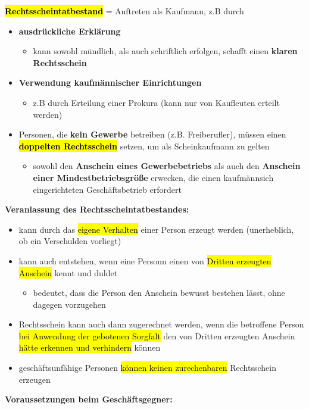 \documentclass[a4paper, 10pt]{article}
\begin{document}
\noindent\textbf{\hl{Rechtsscheintatbestand}} = Auftreten als Kaufmann, z.B durch
\begin{itemize}
    \item \textbf{ausdrückliche Erklärung}
    \begin{itemize}
        \item kann sowohl mündlich, als auch schriftlich erfolgen, schafft einen \textbf{klaren Rechtsschein}
    \end{itemize}

    \item \textbf{Verwendung kaufmännischer Einrichtungen}
    \begin{itemize}
        \item z.B durch Erteilung einer Prokura (kann nur von Kaufleuten erteilt werden)
    \end{itemize}
    \item Personen, die \textbf{kein Gewerbe} betreiben (z.B. Freiberufler), müssen einen \textbf{\hl{doppelten Rechtsschein}} setzen, um als Scheinkaufmann zu gelten
    \begin{itemize}
        \item sowohl den \textbf{Anschein eines Gewerbebetriebs} als auch den \textbf{Anschein einer Mindestbetriebsgröße} erwecken, die einen kaufmännsich eingerichteten Geschäftsbetrieb erfordert
    \end{itemize}
\end{itemize}
\textbf{Veranlassung des Rechtsscheintatbestandes:}
\begin{itemize}
    \item kann durch das \hl{eigene Verhalten} einer Person erzeugt werden (unerheblich, ob ein Verschulden vorliegt)
    \item kann auch entstehen, wenn eine Personn einen von \hl{Dritten erzeugten Anschein} kennt und duldet
    \begin{itemize}
        \item bedeutet, dass die Person den Anschein bewusst bestehen lässt, ohne dagegen vorzugehen
    \end{itemize}
    \item Rechtsschein kann auch dann zugerechnet werden, wenn die betroffene Person \hl{bei Anwendung der gebotenen Sorgfalt} den von Dritten erzeugten Anschein \hl{hätte erkennen und verhindern} können
    \item geschäftsunfähige Personen \hl{können keinen zurechenbaren} Rechtsschein erzeugen
\end{itemize}
\textbf{Voraussetzungen beim Geschäftsgegner:}
\end{document}
